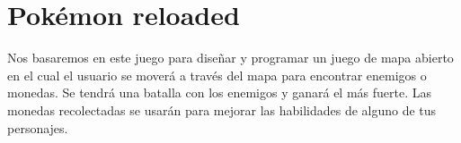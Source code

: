 \documentclass{article}
\begin{document}
\section{Pokémon reloaded}
Nos basaremos en este juego para diseñar y programar un juego de mapa abierto en el cual el usuario se moverá a través del mapa para encontrar enemigos o monedas. Se tendrá una batalla con los enemigos y ganará el más fuerte. Las monedas recolectadas se usarán para mejorar las habilidades de alguno de tus personajes.
\end{document}
